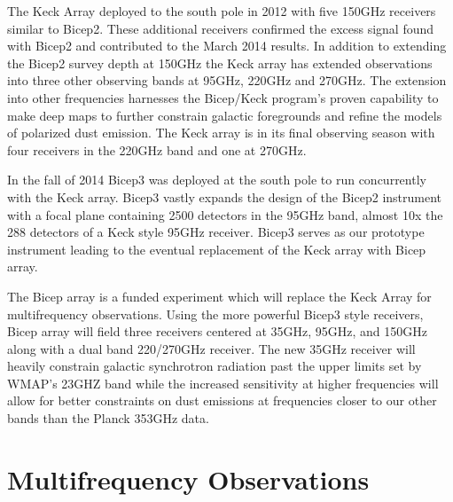 \documentclass[12pt]{article}
\begin{document}
The Keck Array deployed to the south pole in 2012 with five 150GHz receivers
similar to Bicep2. These additional receivers confirmed the excess signal
found with Bicep2 and contributed to the March 2014 results. In addition to
extending the Bicep2 survey depth at 150GHz the Keck array has extended
observations into three other observing bands at 95GHz, 220GHz and 270GHz. The
extension into other frequencies harnesses the Bicep/Keck program's proven
capability to make deep maps to further constrain galactic foregrounds and
refine the models of polarized dust emission. The Keck array is in its final
observing season with four receivers in the 220GHz band and one at 270GHz.

In the fall of 2014 Bicep3 was deployed at the south pole to run concurrently
with the Keck array. Bicep3 vastly expands the design of the Bicep2 instrument with a
focal plane containing 2500 detectors in the 95GHz band, almost 10x the 288
detectors of a Keck style 95GHz receiver. Bicep3 serves as our prototype
instrument leading to the eventual replacement of the Keck array with Bicep
array.

The Bicep array is a funded experiment which will replace the Keck Array for
multifrequency observations. Using the more powerful Bicep3 style receivers,
Bicep array will field three receivers centered at 35GHz, 95GHz, and 150GHz
along with a dual band 220/270GHz receiver. The new 35GHz receiver will
heavily constrain galactic synchrotron radiation past the upper limits set by
WMAP's 23GHZ band while the increased sensitivity at higher frequencies will
allow for better constraints on dust emissions at frequencies closer to our
other bands than the Planck 353GHz data.


\section{Multifrequency Observations}
\end{document}
